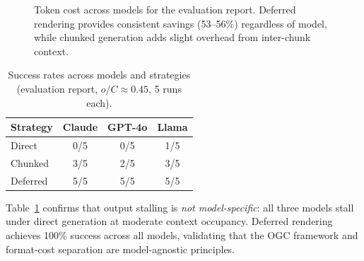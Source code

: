 \documentclass[11pt,twocolumn]{article}
\begin{document}
\begin{figure}[t]
\centering
{}
\caption{Token cost across models for the evaluation report.
Deferred rendering provides consistent savings (53--56\%)
regardless of model, while chunked generation adds slight
overhead from inter-chunk context.}
\label{fig:cross_model}
\end{figure}

\begin{table}[t]
\centering
\caption{Success rates across models and strategies (evaluation
report, $o/C \approx 0.45$, 5 runs each).}
\label{tab:success}
\small
\setlength{\tabcolsep}{4pt}
\begin{tabular}{@{}lccc@{}}
\toprule
\textbf{Strategy} & \textbf{Claude} & \textbf{GPT-4o} & \textbf{Llama} \\
\midrule
Direct    & 0/5 & 0/5 & 1/5 \\
Chunked   & 3/5 & 2/5 & 3/5 \\
Deferred  & 5/5 & 5/5 & 5/5 \\
\bottomrule
\end{tabular}
\end{table}

Table~\ref{tab:success} confirms that output stalling is
\emph{not model-specific}: all three models stall under direct
generation at moderate context occupancy.  Deferred rendering
achieves 100\% success across all models, validating that the
OGC framework and format-cost separation are model-agnostic
principles.
\end{document}
